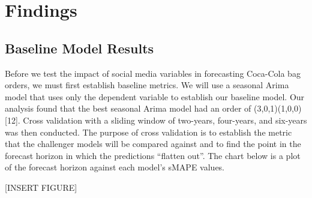 \documentclass[12pt,oneside]{chicagocapstone}
\begin{document}
\hypertarget{findings}{%
\chapter*{Findings}\label{findings}}

\hypertarget{baseline-model-results}{%
\section*{Baseline Model Results}\label{baseline-model-results}}

Before we test the impact of social media variables in forecasting Coca-Cola bag orders, we must first establish baseline metrics. We will use a seasonal Arima model that uses only the dependent variable to establish our baseline model. Our analysis found that the best seasonal Arima model had an order of (3,0,1)(1,0,0){[}12{]}. Cross validation with a sliding window of two-years, four-years, and six-years was then conducted. The purpose of cross validation is to establish the metric that the challenger models will be compared against and to find the point in the forecast horizon in which the predictions ``flatten out''. The chart below is a plot of the forecast horizon against each model's sMAPE values.

{[}INSERT FIGURE{]}
\end{document}
